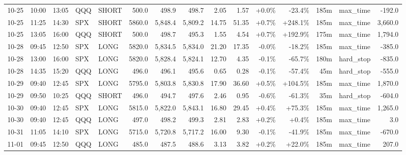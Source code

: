 \documentclass[11pt,a4paper,twoside]{article}
\begin{document}
\begin{landscape}
\begin{center}
\begin{longtable}{>{\color{txtmain}}l l l l l r r r r r r r r >{\color{txtmain}}l r}
10-25 & 10:00 & 13:05 & QQQ & SHORT & 500.0 & 498.9 & 498.7 & 2.05 & 1.57 & \textcolor{wingreen}{+0.0\%} & \textcolor{lossred}{-23.4\%} & 185m & max\_time & \textcolor{lossred}{-192.0} \\
10-25 & 11:25 & 14:30 & SPX & SHORT & 5860.0 & 5,848.4 & 5,809.2 & 14.75 & 51.35 & \textcolor{wingreen}{+0.7\%} & \textcolor{wingreen}{+248.1\%} & 185m & max\_time & \textcolor{wingreen}{3,660.0} \\
10-25 & 13:05 & 16:00 & QQQ & SHORT & 500.0 & 498.7 & 495.3 & 1.55 & 4.54 & \textcolor{wingreen}{+0.7\%} & \textcolor{wingreen}{+192.9\%} & 175m & max\_time & \textcolor{wingreen}{1,794.0} \\
10-28 & 09:45 & 12:50 & SPX & LONG & 5820.0 & 5,834.5 & 5,834.0 & 21.20 & 17.35 & \textcolor{lossred}{-0.0\%} & \textcolor{lossred}{-18.2\%} & 185m & max\_time & \textcolor{lossred}{-385.0} \\
10-28 & 13:00 & 16:00 & SPX & LONG & 5820.0 & 5,828.4 & 5,824.1 & 12.70 & 4.35 & \textcolor{lossred}{-0.1\%} & \textcolor{lossred}{-65.7\%} & 180m & hard\_stop & \textcolor{lossred}{-835.0} \\
10-28 & 14:35 & 15:20 & QQQ & LONG & 496.0 & 496.1 & 495.6 & 0.65 & 0.28 & \textcolor{lossred}{-0.1\%} & \textcolor{lossred}{-57.4\%} & 45m & hard\_stop & \textcolor{lossred}{-555.0} \\
10-29 & 09:40 & 12:45 & SPX & LONG & 5795.0 & 5,803.8 & 5,830.8 & 17.90 & 36.60 & \textcolor{wingreen}{+0.5\%} & \textcolor{wingreen}{+104.5\%} & 185m & max\_time & \textcolor{wingreen}{1,870.0} \\
10-29 & 09:50 & 10:25 & QQQ & SHORT & 496.0 & 494.7 & 497.6 & 2.46 & 0.95 & \textcolor{lossred}{-0.6\%} & \textcolor{lossred}{-61.3\%} & 35m & hard\_stop & \textcolor{lossred}{-604.0} \\
10-30 & 09:40 & 12:45 & SPX & LONG & 5815.0 & 5,822.0 & 5,843.1 & 16.80 & 29.45 & \textcolor{wingreen}{+0.4\%} & \textcolor{wingreen}{+75.3\%} & 185m & max\_time & \textcolor{wingreen}{1,265.0} \\
10-30 & 09:40 & 12:45 & QQQ & LONG & 497.0 & 498.2 & 499.3 & 2.81 & 2.83 & \textcolor{wingreen}{+0.2\%} & \textcolor{wingreen}{+0.4\%} & 185m & max\_time & \textcolor{wingreen}{3.0} \\
10-31 & 11:05 & 14:10 & SPX & LONG & 5715.0 & 5,720.8 & 5,717.2 & 16.00 & 9.30 & \textcolor{lossred}{-0.1\%} & \textcolor{lossred}{-41.9\%} & 185m & max\_time & \textcolor{lossred}{-670.0} \\
11-01 & 09:45 & 12:50 & QQQ & LONG & 485.0 & 487.5 & 488.6 & 3.13 & 3.82 & \textcolor{wingreen}{+0.2\%} & \textcolor{wingreen}{+22.0\%} & 185m & max\_time & \textcolor{wingreen}{207.0} \\

\end{longtable}
\end{center}
\end{landscape}
\end{document}
